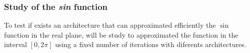 \documentclass[a4paper, 11pt]{article}
\begin{document}
\subsubsection{Study of the \textit{sin} function}
To test if exists an architecture that can approximated efficiently the $\sin$ function in the real plane, will be study to approximated the function in the interval $[0, 2\pi]$ using a fixed number of iterations with diferents architectures.    
\begin{figure}[h]
        \centering
    \hspace{1em}
    \\

\end{figure}
\end{document}
